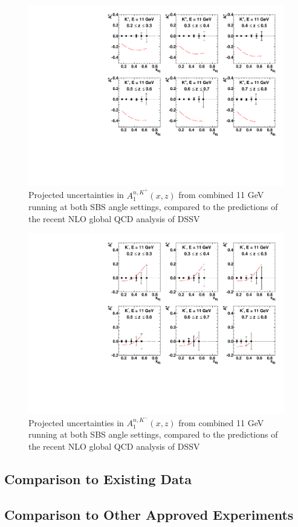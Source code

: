 \begin{figure}[h]
  \begin{center}
    \includegraphics[width=.75\textwidth]{figures/A1n_vs_x_E11_kp.pdf}
  \end{center}
  \caption{\label{A1n_kp_11gev} Projected uncertainties in $A_1^{n,K^+}(x,z)$ from combined 11 GeV running at both SBS angle settings, compared to the predictions of the recent NLO global QCD analysis of DSSV~\cite{deFlorian:2014yva}}
\end{figure}

\begin{figure}[h]
  \begin{center}
    \includegraphics[width=.75\textwidth]{figures/A1n_vs_x_E11_km.pdf}
  \end{center}
  \caption{\label{A1n_km_11gev} Projected uncertainties in $A_1^{n,K^-}(x,z)$ from combined 11 GeV running at both SBS angle settings, compared to the predictions of the recent NLO global QCD analysis of DSSV~\cite{deFlorian:2014yva}}
\end{figure}



\subsection{Comparison to Existing Data}
\subsection{Comparison to Other Approved Experiments}

